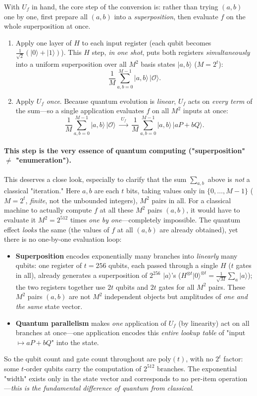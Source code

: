 \documentclass[11pt]{article}
\begin{document}
With $U_f$ in hand, the core step of the conversion is: rather than trying $(a,b)$ one by one, first prepare all $(a,b)$ into a \emph{superposition}, then evaluate $f$
on the whole superposition at once.
\begin{enumerate}[leftmargin=1.9em]
\item Apply one layer of $H$ to each input register (each qubit becomes $\tfrac{1}{\sqrt2}(\lvert0\rangle+\lvert1\rangle)$). This $H$
step, \emph{in one shot}, puts both registers \emph{simultaneously} into a uniform superposition over all $M^2$ basis states $\lvert a,b\rangle$ ($M=2^t$):
\[
\frac{1}{M}\sum_{a,b=0}^{M-1}\lvert a,b\rangle\,\lvert\mathcal{O}\rangle .
\]
\item Apply $U_f$ \emph{once}. Because quantum evolution is \emph{linear}, $U_f$ acts on \emph{every term} of the sum---so a single application evaluates $f$ on all
$M^2$ inputs at once:
\[
\frac{1}{M}\sum_{a,b=0}^{M-1}\lvert a,b\rangle\,\lvert\mathcal{O}\rangle
\;\xrightarrow{\;U_f\;}\;
\frac{1}{M}\sum_{a,b=0}^{M-1}\lvert a,b\rangle\,\lvert aP+bQ\rangle .
\]
\end{enumerate}
\paragraph{This step is the very essence of quantum computing ("superposition" $\neq$ "enumeration").}
This deserves a close look, especially to clarify that the sum $\sum_{a,b}$ above is \emph{not} a classical "iteration." Here $a,b$ are each $t$ bits,
taking values only in $\{0,\dots,M-1\}$ ($M=2^t$, \emph{finite}, not the unbounded integers), $M^2$ pairs in all. For a classical machine to actually compute $f$ at all these $M^2$ pairs $(a,b)$,
it would have to evaluate it $M^2=2^{512}$ times \emph{one by one}---completely impossible. The quantum effect \emph{looks} the same (the values of $f$ at all $(a,b)$ are already
obtained), yet there is no one-by-one evaluation loop:
\begin{itemize}[leftmargin=1.4em]
\item \textbf{Superposition} encodes exponentially many branches into \emph{linearly} many qubits: one register of $t=256$ qubits, each passed through a single $H$ ($t$ gates in all), already generates
a superposition of $2^{256}$ $\lvert a\rangle$'s ($H^{\otimes t}\lvert0\rangle^{\otimes t}=\tfrac{1}{\sqrt M}\sum_a\lvert a\rangle$); the two registers together use $2t$ qubits and $2t$ gates for all $M^2$ pairs. These
$M^2$ pairs $(a,b)$ are not $M^2$ independent objects but amplitudes of \emph{one and the same} state vector.
\item \textbf{Quantum parallelism} makes \emph{one} application of $U_f$ (by linearity) act on all branches at once---one application encodes this \emph{entire lookup table}
of "input $\mapsto aP+bQ$" into the state.
\end{itemize}
So the qubit count and gate count throughout are $\mathrm{poly}(t)$, with no $2^t$ factor: some $t$-order qubits carry the computation of $2^{512}$ branches. The exponential
"width" exists only in the state vector and corresponds to no per-item operation---\emph{this is the fundamental difference of quantum from classical}.
\end{document}
